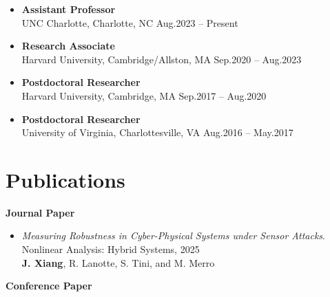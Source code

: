 \documentclass[11pt]{article}
\begin{document}
\begin{itemize}
  \item \textbf{Assistant Professor} \\
UNC Charlotte, Charlotte, NC \hfill Aug.2023 – Present
    \item \textbf{Research Associate} \\
Harvard University, Cambridge/Allston, MA \hfill Sep.2020 – Aug.2023
    \item \textbf{Postdoctoral Researcher} \\
Harvard University, Cambridge, MA \hfill Sep.2017 – Aug.2020
    \item \textbf{Postdoctoral Researcher}	\\
University of Virginia, Charlottesville, VA \hfill  Aug.2016 – May.2017
\end{itemize}





\section{Publications}



\textbf{Journal Paper}

\begin{itemize}
  \item \textit{Measuring Robustness in Cyber-Physical Systems under Sensor Attacks}. \\
  Nonlinear Analysis: Hybrid Systems, 2025 \\
  \textbf{J. Xiang}, R. Lanotte, S. Tini, and M. Merro
  


\end{itemize}

\textbf{Conference Paper}
\end{document}

